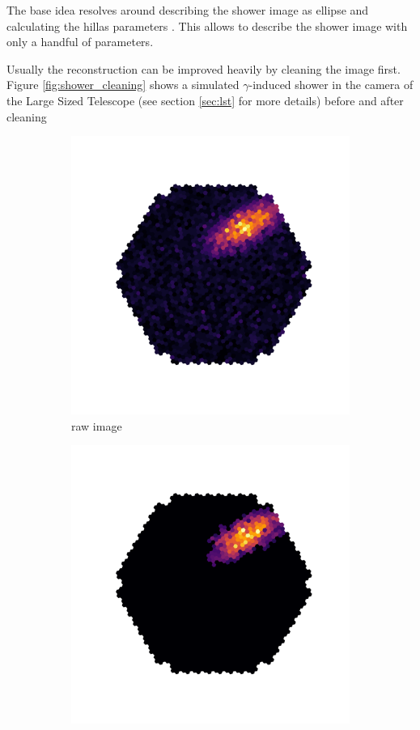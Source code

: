 The base idea resolves around describing the 
shower image as ellipse and calculating the hillas parameters \cite{hillas params paper}.
This allows to describe the shower image with only a handful of parameters.


Usually the reconstruction can be improved heavily by cleaning the image first.
Figure \ref{fig:shower_cleaning} shows a simulated $\gamma$-induced shower 
in the camera of the Large Sized Telescope (see section \ref{sec:lst} for more details)
before and after cleaning


\begin{figure}
	\centering
	\begin{subfigure}{.5\textwidth}
  		\centering
  		\includegraphics[width=.9\linewidth]{Plots/hillas_raw.pdf}
		\caption{raw image}
	\end{subfigure}%
	\begin{subfigure}{.5\textwidth}
 		\centering
		\includegraphics[width=.9\linewidth]{Plots/hillas_cleaned.pdf}

\end{subfigure}
\end{figure}
